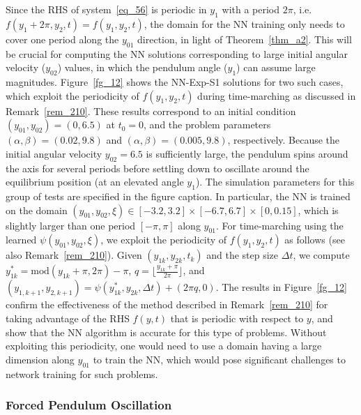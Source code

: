 Since the RHS of system~\eqref{eq_56} is periodic in $y_1$ with a period $2\pi$,
i.e.~$f(y_1+2\pi,y_2,t)=f(y_1,y_2,t)$, the domain for the NN training
only needs to cover one period along the $y_{01}$ direction, in light of
Theorem~\ref{thm_a2}.
This will be crucial for computing the NN solutions corresponding to large
initial angular velocity ($y_{02}$) values, in which the pendulum angle ($y_1$)
can assume large magnitudes.
Figure~\ref{fg_12} shows the NN-Exp-S1 solutions for two such cases,
which exploit the periodicity of $f(y_1,y_2,t)$ during time-marching as
discussed in Remark~\ref{rem_210}.
These results correspond to an initial condition $(y_{01},y_{02})=(0,6.5)$ at $t_0=0$,
and the problem parameters $(\alpha,\beta)=(0.02,9.8)$ and $(\alpha,\beta)=(0.005,9.8)$,
respectively. Because the initial angular velocity $y_{02}=6.5$ is sufficiently
large, the pendulum spins around the axis for several periods before
settling down to oscillate around the equilibrium position (at an elevated angle $y_1$).
The simulation parameters for this group of tests are specified in the figure caption.
In particular, the NN is trained on the domain
$(y_{01},y_{02},\xi)\in[-3.2,3.2]\times[-6.7,6.7]\times[0,0.15]$, which
is slightly larger than one period $[-\pi,\pi]$ along $y_{01}$.
For time-marching using the learned $\psi(y_{01},y_{02},\xi)$, we exploit
the periodicity of $f(y_1,y_2,t)$ as follows (see also Remark~\ref{rem_210}).
Given $(y_{1k},y_{2k},t_k)$ and the step size $\Delta t$,
we compute $y_{1k}^*=\text{mod}(y_{1k}+\pi,2\pi)-\pi$,
$q=\lfloor\frac{y_{1k}+\pi}{2\pi} \rfloor$, and
$(y_{1,k+1},y_{2,k+1})=\psi(y_{1k}^*,y_{2k},\Delta t)+(2\pi q, 0)$.
The results in Figure~\ref{fg_12} confirm the effectiveness of
the method described in Remark~\ref{rem_210}
for taking advantage of the RHS $f(y,t)$ that is periodic with respect to $y$,
and show that the NN algorithm is accurate for this type of problems.
Without exploiting this periodicity, one would need to use a domain having a
large dimension along $y_{01}$ to train the NN,
which would pose significant challenges to network training for such problems.


\subsubsection{Forced Pendulum Oscillation}
\label{sec_322}


